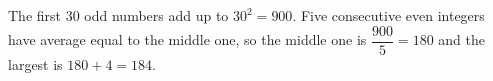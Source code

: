 The first $30$ odd numbers add up to $30^2=900$. Five consecutive even integers have average equal to the middle one, so the middle one is $\dfrac{900}{5}=180$ and the largest is $180+4=\boxed{184}$.
